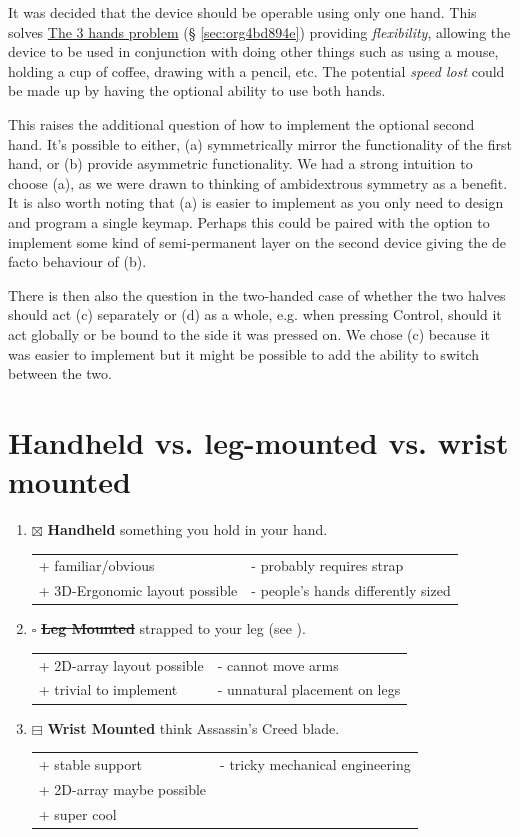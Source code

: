 \documentclass[logo,bsc,singlespacing,parskip]{infthesis}
\begin{document}
It was decided that the device should be operable using only one hand.
This solves \hyperref[sec:org4bd894e]{The 3 hands problem} (§ \ref{sec:org4bd894e}) providing \emph{flexibility}, allowing the device to be used in conjunction with doing other things such as using a mouse, holding a cup of coffee, drawing with a pencil, etc.
The potential \emph{speed lost} could be made up by having the optional ability to use both hands.

This raises the additional question of how to implement the optional second hand.
It's possible to either, (a) symmetrically mirror the functionality of the first hand, or (b) provide asymmetric functionality.
We had a strong intuition to choose (a), as we were drawn to thinking of ambidextrous symmetry as a benefit.
It is also worth noting that (a) is easier to implement as you only need to design and program a single keymap.
Perhaps this could be paired with the option to implement some kind of semi-permanent layer on the second device giving the de facto behaviour of (b).

There is then also the question in the two-handed case of whether the two halves should act (c) separately or (d) as a whole, e.g. when pressing Control, should it act globally or be bound to the side it was pressed on.
We chose (c) because it was easier to implement but it might be possible to add the ability to switch between the two.
\section{Handheld vs. leg-mounted vs. wrist mounted}
\label{sec:org61979b5}
\begin{enumerate}
\item{$\boxtimes$} \textbf{Handheld} something you hold in your hand.
\begin{longtable}{|p{6.25cm}|p{6.25cm}|}
\hline
+ familiar/obvious & - probably requires strap\\
+ 3D-Ergonomic layout possible & - people's hands differently sized\\
\hline
\end{longtable}
\item{$\square$} \sout{\textbf{Leg Mounted}} strapped to your leg (see \autocite{SimulaVR2021}).
\begin{longtable}{|p{6.25cm}|p{6.25cm}|}
\hline
+ 2D-array layout possible & - cannot move arms\\
+ trivial to implement & - unnatural placement on legs\\
\hline
\end{longtable}
\item{$\boxminus$} \textbf{Wrist Mounted} think Assassin's Creed blade.
\begin{longtable}{|p{6.25cm}|p{6.25cm}|}
\hline
+ stable support & - tricky mechanical engineering\\
+ 2D-array maybe possible & \\
+ super cool & \\
\hline
\end{longtable}
\end{enumerate}
\end{document}
